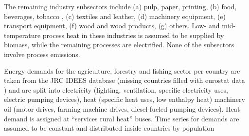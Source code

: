 The remaining industry subsectors include
(a) pulp, paper, printing,
(b) food, beverages, tobacco ,
(c) textiles and leather,
(d) machinery equipment,
(e) transport equipment,
(f) wood and wood products,
(g) others.
Low- and mid-temperature process heat in these industries is assumed to be supplied by biomass,
while the remaining processes are electrified.
None of the subsectors involve process emissions.

Energy demands for the agriculture, forestry and fishing sector per country are
taken from the JRC IDEES database \citeS{} (missing countries filled with
eurostat data \citeS{}) and are split into electricity (lighting, ventilation,
specific electricity uses, electric pumping devices), heat (specific heat uses,
low enthalpy heat) machinery oil (motor drives, farming machine drives,
diesel-fueled pumping devices). Heat demand is assigned at “services rural heat”
buses. Time series for demands are assumed to be constant and distributed inside
countries by population





